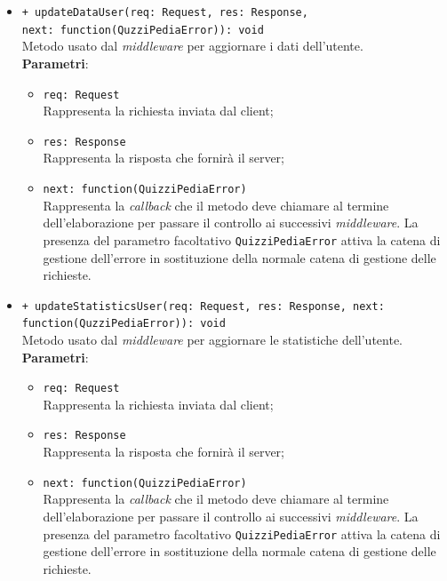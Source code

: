 \begin{itemize}
\begin{itemize}
\begin{itemize}
		 \end{itemize}
		\item
		\texttt{+ updateDataUser(req: Request, res: Response, \\next: function(QuzziPediaError)): void} \\
		Metodo usato dal \textit{middleware} per aggiornare i dati dell'utente. \\
		\textbf{Parametri}:
		 \begin{itemize}
		  \item
			\texttt{req: Request} \\
			Rappresenta la richiesta inviata dal client;
		  \item
			\texttt{res: Response} \\
			Rappresenta la risposta che fornirà il server;
		  \item
		    \texttt{next: function(QuizziPediaError)} \\
			Rappresenta la \textit{callback} che il metodo deve chiamare al termine dell'elaborazione per passare il controllo ai successivi \textit{middleware}. La presenza del parametro facoltativo \texttt{QuizziPediaError} attiva la catena di gestione dell'errore in sostituzione della normale catena di gestione delle richieste.
		 \end{itemize}
		 \item
		\texttt{+ updateStatisticsUser(req: Request, res: Response, next: \\function(QuzziPediaError)): void} \\
		Metodo usato dal \textit{middleware} per aggiornare le statistiche dell'utente. \\
		\textbf{Parametri}:
		 \begin{itemize}
		  \item
			\texttt{req: Request} \\
			Rappresenta la richiesta inviata dal client;
		  \item
			\texttt{res: Response} \\
			Rappresenta la risposta che fornirà il server;
		  \item
		    \texttt{next: function(QuizziPediaError)} \\
			Rappresenta la \textit{callback} che il metodo deve chiamare al termine dell'elaborazione per passare il controllo ai successivi \textit{middleware}. La presenza del parametro facoltativo \texttt{QuizziPediaError} attiva la catena di gestione dell'errore in sostituzione della normale catena di gestione delle richieste.

\end{itemize}
\end{itemize}
\end{itemize}

